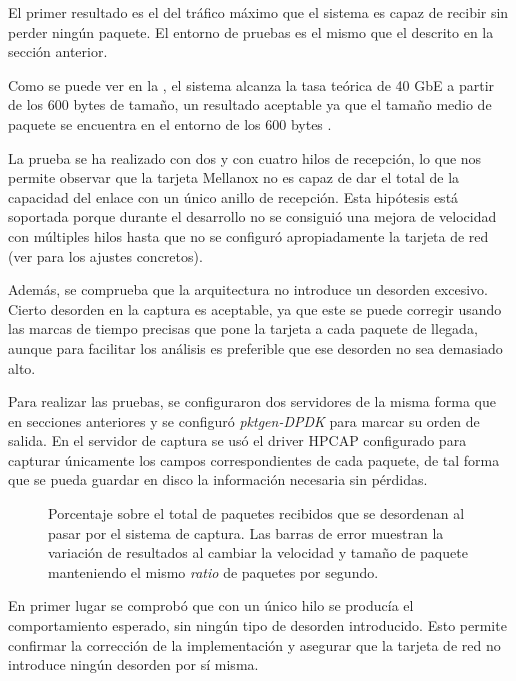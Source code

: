 \documentclass[twoside, 12pt, draft]{epstfg}
\begin{document}
El primer resultado es el del tráfico máximo que el sistema es capaz de recibir sin perder ningún paquete. El entorno de pruebas es el mismo que el descrito en la sección anterior.

Como se puede ver en la , el sistema alcanza la tasa teórica de 40 GbE a partir de los 600 bytes de tamaño, un resultado aceptable ya que el tamaño medio de paquete se encuentra en el entorno de los 600 bytes \cite{john2007analysis}.

La prueba se ha realizado con dos y con cuatro hilos de recepción, lo que nos permite observar que la tarjeta Mellanox no es capaz de dar el total de la capacidad del enlace con un único anillo de recepción. Esta hipótesis está soportada porque durante el desarrollo no se consiguió una mejora de velocidad con múltiples hilos hasta que no se configuró apropiadamente la tarjeta de red (ver  para los ajustes concretos).

Además, se comprueba que la arquitectura no introduce un desorden excesivo. Cierto desorden en la captura es aceptable, ya que este se puede corregir usando las marcas de tiempo precisas que pone la tarjeta a cada paquete de llegada, aunque para facilitar los análisis es preferible que ese desorden no sea demasiado alto.

Para realizar las pruebas, se configuraron dos servidores de la misma forma que en secciones anteriores y se configuró \textit{pktgen-DPDK} para marcar su orden de salida. En el servidor de captura se usó el driver HPCAP configurado para capturar únicamente los campos correspondientes de cada paquete, de tal forma que se pueda guardar en disco la información necesaria sin pérdidas.

\begin{figure}[bp]
\caption[Desorden de paquetes inducido por el sistema de captura]{Porcentaje sobre el total de paquetes recibidos que se desordenan al pasar por el sistema de captura. Las barras de error muestran la variación de resultados al cambiar la velocidad y tamaño de paquete manteniendo el mismo \textit{ratio} de paquetes por segundo.}
\label{fig:Validacion:Ordering}
\end{figure}

En primer lugar se comprobó que con un único hilo se producía el comportamiento esperado, sin ningún tipo de desorden introducido. Esto permite confirmar la corrección de la implementación y asegurar que la tarjeta de red no introduce ningún desorden por sí misma.
\end{document}
